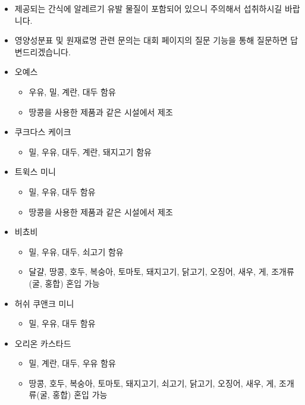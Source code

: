 \begin{itemize}[noitemsep]
    \item 제공되는 간식에 알레르기 유발 물질이 포함되어 있으니 주의해서 섭취하시길 바랍니다.
    \item 영양성분표 및 원재료명 관련 문의는 대회 페이지의 질문 기능을 통해 질문하면 답변드리겠습니다.
    \item 오예스
    \begin{itemize}[noitemsep,topsep=0pt]
        \item 우유, 밀, 계란, 대두 함유
        \item 땅콩을 사용한 제품과 같은 시설에서 제조
    \end{itemize}
    \item 쿠크다스 케이크
    \begin{itemize}[noitemsep,topsep=0pt]
        \item 밀, 우유, 대두, 계란, 돼지고기 함유
    \end{itemize}
    \item 트윅스 미니
    \begin{itemize}[noitemsep,topsep=0pt]
        \item 밀, 우유, 대두 함유
        \item 땅콩을 사용한 제품과 같은 시설에서 제조
    \end{itemize}
    \item 비쵸비
    \begin{itemize}[noitemsep,topsep=0pt]
        \item 밀, 우유, 대두, 쇠고기 함유
        \item 달걀, 땅콩, 호두, 복숭아, 토마토, 돼지고기, 닭고기, 오징어, 새우, 게, 조개류(굴, 홍합) 혼입 가능
    \end{itemize}
    \item 허쉬 쿠앤크 미니
    \begin{itemize}[noitemsep,topsep=0pt]
        \item 밀, 우유, 대두 함유
    \end{itemize}
    \item 오리온 카스타드
    \begin{itemize}[noitemsep,topsep=0pt]
        \item 밀, 계란, 대두, 우유 함유
        \item 땅콩, 호두, 복숭아, 토마토, 돼지고기, 쇠고기, 닭고기, 오징어, 새우, 게, 조개류(굴, 홍합) 혼입 가능
    \end{itemize}
\end{itemize}